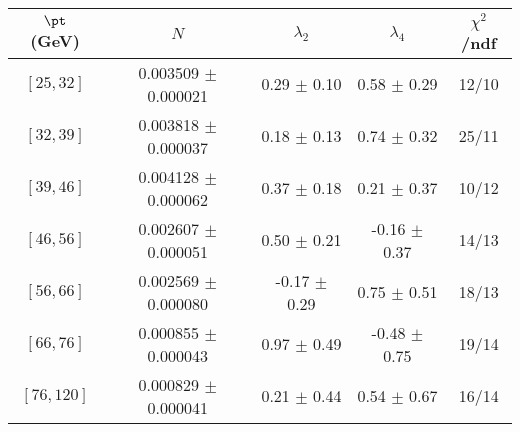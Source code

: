 \begin{tabular}{c||c|c|c|c}
$\pt$ (GeV) & $N$ & $\lambda_{2}$ & $\lambda_4$  & $\chi^2$/ndf  \\
\hline
$[25, 32]$ & 0.003509 $\pm$ 0.000021 & 0.29 $\pm$ 0.10 & 0.58 $\pm$ 0.29 & 12/10\\
$[32, 39]$ & 0.003818 $\pm$ 0.000037 & 0.18 $\pm$ 0.13 & 0.74 $\pm$ 0.32 & 25/11\\
$[39, 46]$ & 0.004128 $\pm$ 0.000062 & 0.37 $\pm$ 0.18 & 0.21 $\pm$ 0.37 & 10/12\\
$[46, 56]$ & 0.002607 $\pm$ 0.000051 & 0.50 $\pm$ 0.21 & -0.16 $\pm$ 0.37 & 14/13\\
$[56, 66]$ & 0.002569 $\pm$ 0.000080 & -0.17 $\pm$ 0.29 & 0.75 $\pm$ 0.51 & 18/13\\
$[66, 76]$ & 0.000855 $\pm$ 0.000043 & 0.97 $\pm$ 0.49 & -0.48 $\pm$ 0.75 & 19/14\\
$[76, 120]$ & 0.000829 $\pm$ 0.000041 & 0.21 $\pm$ 0.44 & 0.54 $\pm$ 0.67 & 16/14\\
\end{tabular}
